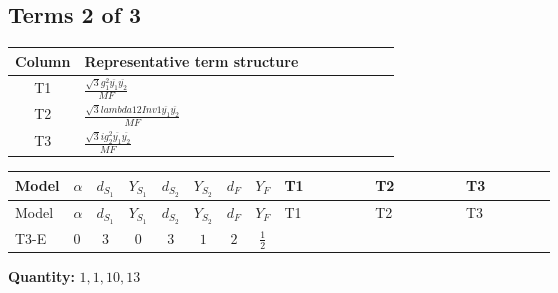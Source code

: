 \documentclass[8pt]{article}
\begin{document}
\begin{landscape}
\subsection*{Terms 2 of 3}
\begin{center}
\begin{tabular}{@{}c >{\raggedright\arraybackslash}p{0.82\linewidth}@{}}
\toprule
Column & Representative term structure \\
\midrule
T1 & \(\displaystyle \frac{\sqrt{3} g_{1}^{2} \overline{y_{1}} \overline{y_{2}}}{MF}\) \\
\midrule
T2 & \(\displaystyle \frac{\sqrt{3} lambda12Inv1 \overline{y_{1}} \overline{y_{2}}}{MF}\) \\
\midrule
T3 & \(\displaystyle \frac{\sqrt{3} i g_{2}^{2} \overline{y_{1}} \overline{y_{2}}}{MF}\) \\
\midrule
\bottomrule
\end{tabular}
\end{center}
\smallskip
\tiny
\begin{longtable}{@{}llcccccc >{\raggedright\arraybackslash}p{0.21\linewidth} >{\raggedright\arraybackslash}p{0.21\linewidth} >{\raggedright\arraybackslash}p{0.21\linewidth}@{}}
\toprule
Model & $\alpha$ & $d_{S_1}$ & $Y_{S_1}$ & $d_{S_2}$ & $Y_{S_2}$ & $d_F$ & $Y_F$ & T1 & T2 & T3 \\
\midrule
\endfirsthead
\toprule
Model & $\alpha$ & $d_{S_1}$ & $Y_{S_1}$ & $d_{S_2}$ & $Y_{S_2}$ & $d_F$ & $Y_F$ & T1 & T2 & T3 \\
\midrule
\endhead
T3-E & $0$ & $3$ & $0$ & $3$ & $1$ & $2$ & $\frac{1}{2}$ & \scriptsize\adjustbox{max width=\linewidth}{$\begin{gathered} - \frac{\sqrt{3} g_{1}^{2} \overline{y_{1}} \overline{y_{2}}}{8 MF}\end{gathered}$} & \scriptsize\adjustbox{max width=\linewidth}{$\begin{gathered} \frac{\sqrt{3} lambda12Inv1 \overline{y_{1}} \overline{y_{2}}}{6 MF}\end{gathered}$} & \scriptsize\adjustbox{max width=\linewidth}{$\begin{gathered} \frac{\sqrt{3} i g_{2}^{2} \overline{y_{1}} \overline{y_{2}}}{6 MF}\end{gathered}$} \\
\midrule
\bottomrule
\end{longtable}
\clearpage
\noindent\textbf{Quantity: }$\mathrm{1,1,10,13}$\par\smallskip

\end{landscape}
\end{document}
